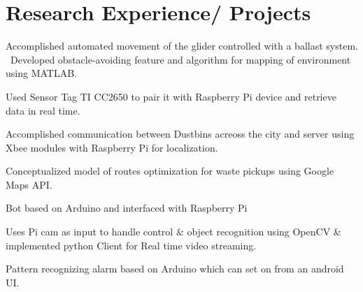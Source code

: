 \documentclass[letterpaper]{akhilesh}
\begin{document}
\hfill
\begin{minipage}[t]{0.599\textwidth} 



\section{Research Experience/ Projects}

\vspace{\topsep}
\begin{tightemize}
\item Accomplished automated movement of the glider controlled with a ballast system.
\ Developed obstacle-avoiding feature and algorithm for mapping of environment using MATLAB.
\item Used Sensor Tag TI CC2650 to pair it with Raspberry Pi device and retrieve data in real time.
\end{tightemize}
\sectionsep


\begin{tightemize}
\item Accomplished communication between Dustbins acreoss the city and server using Xbee modules with Raspberry Pi for localization.
\item Conceptualized model of routes optimization for waste pickups using Google Maps API.
\end{tightemize}
\sectionsep

\begin{tightemize}
\item Bot based on Arduino and interfaced with Raspberry Pi 
\item Uses Pi cam as input to handle control \& object recognition using OpenCV \& implemented python Client for Real time video streaming.
\end{tightemize}
\sectionsep

\begin{tightemize}
\item Pattern recognizing alarm based on Arduino which can set on from an android UI.
\end{tightemize}
\sectionsep


\end{minipage}
\end{document}
